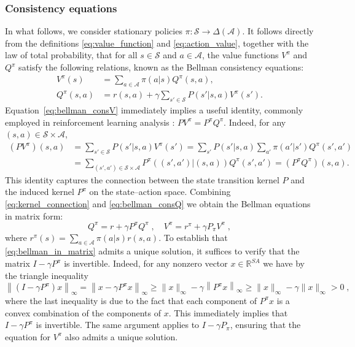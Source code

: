 \documentclass{article}
\numberwithin{equation}{section}
\newcommand{\cA}{\mathcal{A}}
\newcommand{\cS}{\mathcal{S}}
\newcommand{\eqsp}{\;}
\def\rp{r^\pi}
\begin{document}
\subsubsection{Consistency equations}


In what follows, we consider stationary policies \(\pi:\cS\rightarrow \Delta(\cA)\).
It follows directly from the definitions \eqref{eq:value_function} and \eqref{eq:action_value}, together with the law of total probability, that for all \(s\in\cS\) and \(a\in\cA\), the value functions $V^\pi$ and $Q^\pi$ satisfy the following relations, known as the Bellman consistency equations:
\begin{align}
    \label{eq:bellman_consV}
    V^\pi(s) &= \sum_{a\in\cA}\pi(a|s)Q^\pi(s, a),\\
    \label{eq:bellman_consQ}
    Q^\pi(s, a) &= r(s, a) + \gamma \sum_{s'\in\cS} P(s'|s,a) V^\pi(s').
\end{align}
Equation~\eqref{eq:bellman_consV} immediately implies a useful identity, commonly employed in reinforcement learning analysis :  \(P V^\pi = P^\pi Q^\pi\). Indeed, for any \((s,a)\in \cS\times\cA\),
\begin{align}\label{eq:kernel_connection}
(P V^\pi)(s,a)
&= \sum_{s'\in\cS} P(s' | s,a) V^\pi(s') = \sum_{s'} P(s'|s,a)
\sum_{a'}\pi(a'|s')Q^\pi(s',a') \\
&= \sum_{(s',a')\in\cS\times\cA} P^\pi((s',a') | (s,a)) Q^\pi(s',a')
= (P^\pi Q^\pi)(s,a).
\end{align}
This identity captures the connection between the state transition kernel \(P\) and the induced kernel \(P^\pi\) on the state–action space.
Combining \eqref{eq:kernel_connection} and \eqref{eq:bellman_consQ}
we obtain the Bellman equations in matrix form:
\begin{equation}
\label{eq:bellman_in_matrix}
Q^{\pi} = r + \gamma P^\pi Q^\pi\eqsp, \quad V^\pi = \rp + \gamma P_\pi V^\pi \eqsp,
\end{equation}
where \(\rp(s) = \sum_{a\in\cA}\pi(a|s)r(s,a)\).
To establish that \eqref{eq:bellman_in_matrix} admits a unique solution, it suffices to verify that the matrix $I-\gamma P^\pi$ is invertible. Indeed, for any nonzero vector $x \in \mathbb{R}^{SA}$ we have by the triangle inequality
\begin{equation*}
    \left\|\left(I-\gamma P^\pi\right) x\right\|_{\infty} =\left\|x-\gamma P^\pi x\right\|_{\infty} \geq\|x\|_{\infty}-\gamma\left\|P^\pi x\right\|_{\infty} \geq\|x\|_{\infty}-\gamma\|x\|_{\infty} > 0\eqsp,
\end{equation*}
where the last inequality is due to the fact that each  component of $P^\pi x$ is a convex combination of the components of $x$. This immediately implies that \(I-\gamma P^\pi\) is invertible. The same argument applies to \(I-\gamma P_\pi\), ensuring that the equation for \(V^\pi\) also admits a unique solution.
\end{document}
